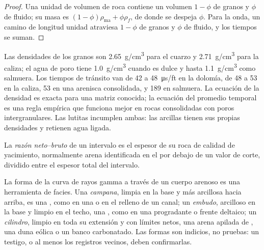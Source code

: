 \begin{proof}
Una unidad de volumen de roca contiene un volumen $1 - \phi$ de granos y $\phi$ de
fluido; su masa es $(1 - \phi)\rho_{\mathrm{ma}} + \phi\rho_f$, de donde se despeja
$\phi$. Para la onda, un camino de longitud unidad atraviesa $1 - \phi$ de
granos y $\phi$ de fluido, y los tiempos se suman.
\end{proof}

Las densidades de los granos son \qty{2.65}{g/cm^3} para el cuarzo y \qty{2.71}{g/cm^3} para
la caliza; el agua de poro tiene \qty{1.0}{g/cm^3} cuando es dulce y hasta
\qty{1.1}{g/cm^3} como salmuera. Los tiempos de tránsito van de 42 a
\qty{48}{\micro\second/ft} en la dolomía, de 48 a 53 en la caliza, 53 en una arenisca
consolidada, y 189 en salmuera. La ecuación de la densidad es exacta para
una matriz conocida; la ecuación del promedio temporal es una regla empírica que funciona
mejor en rocas consolidadas con poros intergranulares. Las lutitas incumplen ambas:
las arcillas tienen sus propias densidades y retienen agua ligada.

\begin{definition}\label{def:b3:facies-models:ntg}
La \emph{razón neto--bruto} de un intervalo es el
espesor de su roca de calidad de yacimiento, normalmente arena identificada en el
 por debajo de un valor de corte, dividido entre el espesor total del intervalo.
\end{definition}

La forma de la curva de rayos gamma a través de un cuerpo arenoso es una herramienta de facies.
Una \emph{campana}, limpia en la base y más arcillosa hacia arriba, es una ,
como en una  o en el relleno de un canal; un \emph{embudo}, arcilloso en
la base y limpio en el techo, una , como en una
 progradante o frente deltaico; un \emph{cilindro}, limpio en toda su extensión y con
límites netos, una arena apilada de , una duna eólica o un
banco carbonatado. Las formas son indicios, no pruebas: un testigo, o al menos los
registros vecinos, deben confirmarlas.

